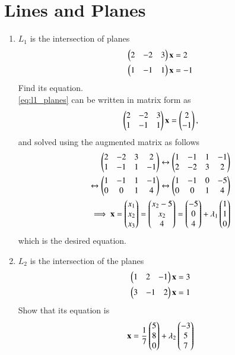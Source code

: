 \documentclass[journal,12pt,twocolumn]{IEEEtran}
\renewcommand\thesection{\arabic{section}}
\begin{document}
\section{Lines and Planes}
\begin{enumerate}[label=\thesection.\arabic*
,ref=\thesection.\theenumi]
\item  $L_1$ is the intersection of planes 
\begin{align}
\begin{split}
\begin{pmatrix}2 & -2 & 3\end{pmatrix}\mathbf{x} &= 2
\\
\begin{pmatrix}1 & -1 & 1\end{pmatrix}\mathbf{x} &= -1
\end{split}
\label{eq:l1_planes}
\end{align}
%
Find its equation.
\\
\solution \eqref{eq:l1_planes} can be written in matrix form as
\begin{align}
\begin{pmatrix}2 & -2 & 3 \\ 1 & -1 & 1\end{pmatrix}\mathbf{x} = \begin{pmatrix}2 \\ -1\end{pmatrix},
\end{align}
%
and solved using the augmented matrix as follows
\begin{align}
\begin{pmatrix}2 & -2 & 3 & 2\\ 1 & -1 & 1 & -1\end{pmatrix} \leftrightarrow \begin{pmatrix} 1 & -1 & 1 & -1 \\ 2 & -2 & 3 & 2\end{pmatrix}
\\
\leftrightarrow \begin{pmatrix} 1 & -1 & 1 & -1 \\ 0 & 0 & 1 & 4\end{pmatrix} \leftrightarrow \begin{pmatrix} 1 & -1 & 0 & -5 \\ 0 & 0 & 1 
& 4\end{pmatrix}
\\
\implies \mathbf{x} = \begin{pmatrix} x_1 \\ x_2 \\ x_3\end{pmatrix} = \begin{pmatrix} x_2-5 \\ x_2 \\ 4\end{pmatrix} = \begin{pmatrix} 
-5 \\ 0 \\ 4\end{pmatrix} + \lambda_1 \begin{pmatrix} 1 \\ 1 \\ 0\end{pmatrix}
\label{eq:l1}
\end{align}
%
which is the desired equation.
\item $L_2$ is the intersection of the planes
\begin{align}
\begin{pmatrix}1 & 2 & -1\end{pmatrix}\mathbf{x} &= 3
\\
\begin{pmatrix}3 & -1 & 2\end{pmatrix}\mathbf{x} &= 1
\end{align}
Show that its equation is
%
\begin{align}
\vec{x} = \frac{1}{7}\myvec{ 5 \\ 8 \\ 0} + \lambda_2 \myvec{ -3 \\ 5 \\ 7}

\end{align}
\end{enumerate}
\end{document}

